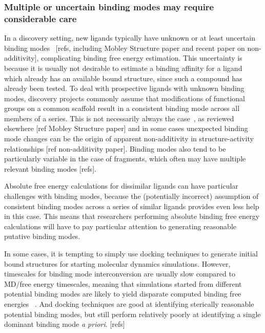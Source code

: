 \documentclass[9pt,bestpractices]{livecoms}
\begin{document}
\subsubsection{Multiple or uncertain binding modes may require considerable care}
\label{sec:multiple_binding_modes}

In a discovery setting, new ligands typically have unknown or at least uncertain binding modes~\cite{Kaus:2015:J.Chem.TheoryComput., PlountPrice:2000:J.Am.Chem.Soc.} [refs, including Mobley Structure paper and recent paper on non-additivity], complicating binding free energy estimation.
This uncertainty is because it is usually not desirable to estimate a binding affinity for a ligand which already has an available bound structure, since such a compound has already been tested.
To deal with prospective ligands with unknown binding modes, discovery projects commonly assume that modifications of functional groups on a common scaffold result in a consistent binding mode across all members of a series.
This is not necessarily always the case~\cite{Kaus:2015:J.Chem.TheoryComput.}, as reviewed elsewhere [ref Mobley Structure paper] and in some cases unexpected binding mode changes can be the origin of apparent non-additivity in structure-activity relationships [ref non-additivity paper].
Binding modes also tend to be particularly variable in the case of fragments, which often may have multiple relevant binding modes [refs].

Absolute free energy calculations for dissimilar ligands can have particular challenges with binding modes, because the (potentially incorrect) assumption of consistent binding modes across a series of similar ligands provides even less help in this case.
This means that researchers performing absolute binding free energy calculations will have to pay particular attention to generating reasonable putative binding modes.

In some cases, it is tempting to simply use docking techniques to generate initial bound structures for starting molecular dynamics simulations.
However, timescales for binding mode interconversion are usually slow compared to MD/free energy timescales, meaning that simulations started from different potential binding modes are likely to yield disparate computed binding free energies~\cite{Mobley:2006:TheJournalofChemicalPhysics, Palma:2012:J.Comput.Chem., Mobley:2012:TheJournalofChemicalPhysics, Gill:2018:J.Phys.Chem.B} .
And docking techniques are good at identifying sterically reasonable potential binding modes, but still perform relatively poorly at identifying a single dominant binding mode \emph{a priori}. [refs] 
\end{document}
